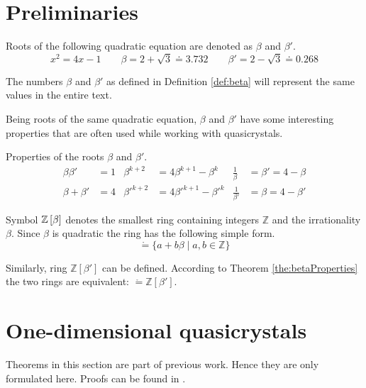 \documentclass[text.tex]{subfiles}
\begin{document}
\section{Preliminaries}%
\begin{definition}
\label{def:beta}
Roots of the following quadratic equation are denoted as $\beta$ and $\beta'$.
$$x^2=4x-1 \qquad \beta = 2 + \sqrt{3} \doteq 3.732 \qquad \beta' = 2 - \sqrt{3} \doteq 0.268$$
\end{definition}

\begin{remark}
The numbers $\beta$ and $\beta'$ as defined in Definition \ref{def:beta} will represent the same values in the entire text.
\end{remark}

Being roots of the same quadratic equation, $\beta$ and $\beta'$ have some interesting properties that are often used while working with quasicrystals. 

\begin{theorem}
\label{the:betaProperties}
Properties of the roots $\beta$ and $\beta'$.
\begin{align*}
\beta\beta' &= 1 &   
\beta^{k+2} &= 4\beta^{k+1} - \beta^k & 
\frac{1}{\beta} &= \beta' = 4 - \beta \\
\beta + \beta' &= 4 &
{\beta'}^{k+2} &= 4{\beta'}^{k+1} - {\beta'}^k &
\frac{1}{\beta'} &= \beta = 4 - \beta'
\end{align*}
\end{theorem}

\begin{definition} 
Symbol $\mathbb{Z}\left[\beta\right]$ denotes the smallest ring containing integers $\mathbb{Z}$ and the irrationality $\beta$. Since $\beta$ is quadratic the ring has the following simple form.
$$\ring = \{ a + b\beta \;|\;a,b\in \mathbb{Z} \}$$
\end{definition}

\begin{remark}
Similarly, ring $\mathbb{Z}[\beta']$ can be defined. According to Theorem \ref{the:betaProperties} the two rings are equivalent: $\ring = \mathbb{Z}\left[\beta'\right]$.
\end{remark}

\section{One-dimensional quasicrystals}
Theorems in this section are part of previous work. Hence they are only formulated here. Proofs can be found in \cite{assignment}.
\end{document}
